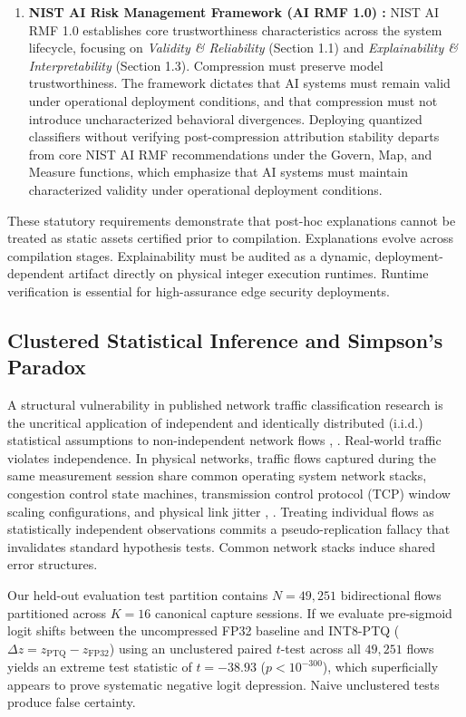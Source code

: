 \documentclass[conference]{IEEEtran}
\begin{document}
\begin{enumerate}
    \item \textbf{NIST AI Risk Management Framework (AI RMF 1.0) \cite{b9}:} NIST AI RMF 1.0 establishes core trustworthiness characteristics across the system lifecycle, focusing on \textit{Validity \& Reliability} (Section 1.1) and \textit{Explainability \& Interpretability} (Section 1.3). Compression must preserve model trustworthiness. The framework dictates that AI systems must remain valid under operational deployment conditions, and that compression must not introduce uncharacterized behavioral divergences. Deploying quantized classifiers without verifying post-compression attribution stability departs from core NIST AI RMF recommendations under the Govern, Map, and Measure functions, which emphasize that AI systems must maintain characterized validity under operational deployment conditions.
\end{enumerate}

These statutory requirements demonstrate that post-hoc explanations cannot be treated as static assets certified prior to compilation. Explanations evolve across compilation stages. Explainability must be audited as a dynamic, deployment-dependent artifact directly on physical integer execution runtimes. Runtime verification is essential for high-assurance edge security deployments.

\subsection{Clustered Statistical Inference and Simpson's Paradox}
A structural vulnerability in published network traffic classification research is the uncritical application of independent and identically distributed (i.i.d.) statistical assumptions to non-independent network flows \cite{b25}, \cite{b26}. Real-world traffic violates independence. In physical networks, traffic flows captured during the same measurement session share common operating system network stacks, congestion control state machines, transmission control protocol (TCP) window scaling configurations, and physical link jitter \cite{b1}, \cite{b24}. Treating individual flows as statistically independent observations commits a pseudo-replication fallacy that invalidates standard hypothesis tests. Common network stacks induce shared error structures.

Our held-out evaluation test partition contains $N = 49,251$ bidirectional flows partitioned across $K = 16$ canonical capture sessions. If we evaluate pre-sigmoid logit shifts between the uncompressed FP32 baseline and INT8-PTQ ($\Delta z = z_{\text{PTQ}} - z_{\text{FP32}}$) using an unclustered paired $t$-test across all $49,251$ flows yields an extreme test statistic of $t = -38.93$ ($p < 10^{-300}$), which superficially appears to prove systematic negative logit depression.
Naive unclustered tests produce false certainty.
\end{document}
